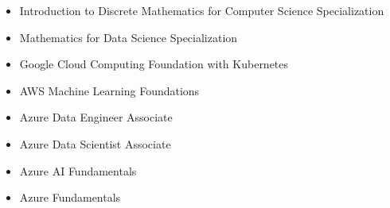 \documentclass[10pt,legalpaper,ragged2e,withhyper]{debjitpalcv}
\newenvironment{sloppypar*}{\sloppy\ignorespaces}{\par}
\begin{document}


\makecvheader



\begin{paracol}{2}

    \begin{sloppypar*}
        \\
        \medskip
        \\
        \medskip
        \\
        \medskip
    \end{sloppypar*}

    \\
    \divider
    \\
    \divider

    \begin{sloppypar*}
        \begin{itemize}
            \item Introduction to Discrete Mathematics for Computer Science Specialization
            \item Mathematics for Data Science Specialization
            \item Google Cloud Computing Foundation with Kubernetes
            \item AWS Machine Learning Foundations
            \item Azure Data Engineer Associate
            \item Azure Data Scientist Associate
            \item Azure AI Fundamentals
            \item Azure Fundamentals
            
        \end{itemize}
    \end{sloppypar*}



\end{paracol}
\end{document}
